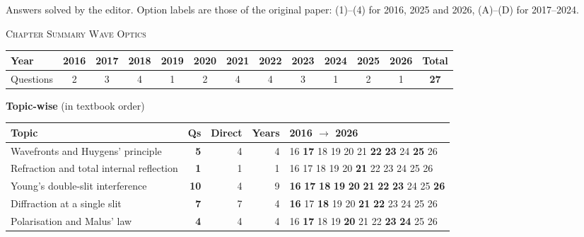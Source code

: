 {\footnotesize Answers solved by the editor. Option labels are those of the original paper: (1)--(4) for 2016, 2025 and 2026, (A)--(D) for 2017--2024.
}\par
\par{}\vspace{14pt}
\begin{center}{}\par
{\large\color{navy}\scshape Chapter Summary \textperiodcentered{} Wave Optics}\end{center}
{\small\setlength{\tabcolsep}{3.5pt}
\begin{tabular*}{\linewidth}{@{\extracolsep{\fill}}l*{11}{c}c@{}}\toprule
Year & 2016 & 2017 & 2018 & 2019 & 2020 & 2021 & 2022 & 2023 & 2024 & 2025 & 2026 & Total\\\midrule
Questions & 2 & 3 & 4 & 1 & 2 & 4 & 4 & 3 & 1 & 2 & 1 & \textbf{27}\\\bottomrule\end{tabular*}}\par\medskip
{\small\textbf{\color{crimson}Topic-wise} (in textbook order)\par\smallskip
\begin{tabularx}{\linewidth}{@{}>{\raggedright\arraybackslash}Xrrrl@{}}\toprule
Topic & Qs & Direct & Years & 2016 $\rightarrow$ 2026\\\midrule
Wavefronts and Huygens' principle & \textbf{5} & 4 & 4 & {\scriptsize {\color{gray!45}16} \textbf{17} {\color{gray!45}18} {\color{gray!45}19} {\color{gray!45}20} {\color{gray!45}21} \textbf{22} \textbf{23} {\color{gray!45}24} \textbf{25} {\color{gray!45}26}}\\
Refraction and total internal reflection & \textbf{1} & 1 & 1 & {\scriptsize {\color{gray!45}16} {\color{gray!45}17} {\color{gray!45}18} {\color{gray!45}19} {\color{gray!45}20} \textbf{21} {\color{gray!45}22} {\color{gray!45}23} {\color{gray!45}24} {\color{gray!45}25} {\color{gray!45}26}}\\
Young's double-slit interference & \textbf{10} & 4 & 9 & {\scriptsize \textbf{16} \textbf{17} \textbf{18} \textbf{19} \textbf{20} \textbf{21} \textbf{22} \textbf{23} {\color{gray!45}24} {\color{gray!45}25} \textbf{26}}\\
Diffraction at a single slit & \textbf{7} & 7 & 4 & {\scriptsize \textbf{16} {\color{gray!45}17} \textbf{18} {\color{gray!45}19} {\color{gray!45}20} \textbf{21} \textbf{22} {\color{gray!45}23} {\color{gray!45}24} {\color{gray!45}25} {\color{gray!45}26}}\\
Polarisation and Malus' law & \textbf{4} & 4 & 4 & {\scriptsize {\color{gray!45}16} \textbf{17} {\color{gray!45}18} {\color{gray!45}19} \textbf{20} {\color{gray!45}21} {\color{gray!45}22} \textbf{23} \textbf{24} {\color{gray!45}25} {\color{gray!45}26}}\\
\bottomrule\end{tabularx}}\par\medskip
